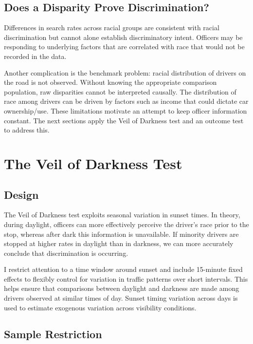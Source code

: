 \documentclass[11pt]{article}
\begin{document}
\subsection*{Does a Disparity Prove Discrimination?}

Differences in search rates across racial groups are consistent with racial
discrimination but cannot alone establish discriminatory intent. Officers may be responding to underlying factors that are correlated with race that would not be recorded in the data.

Another complication is the benchmark problem: racial distribution of
drivers on the road is not observed. Without knowing the appropriate comparison
population, raw disparities cannot be interpreted causally. The distribution of race among drivers can be driven by factors such as income that could dictate car ownership/use. These limitations motivate an attempt to keep officer information constant. The next sections apply the Veil of Darkness test and an outcome test to address this.

\section{The Veil of Darkness Test}
\label{sec:vod}

\subsection*{Design}

The Veil of Darkness test exploits seasonal variation in sunset times. In theory, during
daylight, officers can more effectively perceive the driver’s race prior to the stop, whereas after dark this information is unavailable. If minority drivers are stopped at higher rates in daylight than in darkness, we can more accurately conclude that discrimination is occurring.

I restrict attention to a time window around sunset and include 15-minute fixed effects to flexibly control for variation in traffic patterns over short intervals. This helps ensure that comparisons between daylight and darkness are made among drivers observed at similar times of day. Sunset timing variation across days is used to estimate exogenous variation across visibility conditions.

\subsection*{Sample Restriction}
\end{document}
